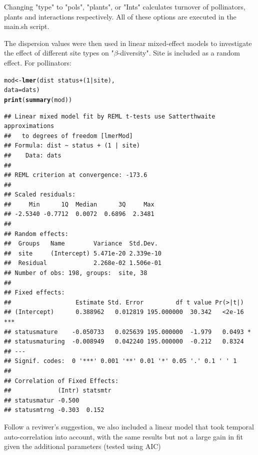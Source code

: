 \documentclass{article}\usepackage[]{graphicx}\usepackage[]{color}
\makeatletter
\newcommand{\hlnum}[1]{\textcolor[rgb]{0.686,0.059,0.569}{#1}}%
\newcommand{\hlopt}[1]{\textcolor[rgb]{0,0,0}{#1}}%
\newcommand{\hlstd}[1]{\textcolor[rgb]{0.345,0.345,0.345}{#1}}%
\newcommand{\hlkwb}[1]{\textcolor[rgb]{0.69,0.353,0.396}{#1}}%
\newcommand{\hlkwc}[1]{\textcolor[rgb]{0.333,0.667,0.333}{#1}}%
\newcommand{\hlkwd}[1]{\textcolor[rgb]{0.737,0.353,0.396}{\textbf{#1}}}%
\newenvironment{kframe}{%
 \def\at@end@of@kframe{}%
 \ifinner\ifhmode%
  \def\at@end@of@kframe{\end{minipage}}%
  \begin{minipage}{\columnwidth}%
 \fi\fi%
 \def\FrameCommand##1{\hskip\@totalleftmargin \hskip-\fboxsep
 \colorbox{shadecolor}{##1}\hskip-\fboxsep
     \hskip-\linewidth \hskip-\@totalleftmargin \hskip\columnwidth}%
 \MakeFramed {\advance\hsize-\width
   \@totalleftmargin\z@ \linewidth\hsize
   \@setminipage}}%
 {\par\unskip\endMakeFramed%
 \at@end@of@kframe}
\newenvironment{knitrout}{}{} %
\makeatother
\begin{document}
Changing "type" to "pols", "plants", or "Ints" calculates turnover of
pollinators, plants and interactions respectively. All of these
options are executed in the main.sh script.

The dispersion values were then used in linear mixed-effect models to
investigate the effect of different site types on
"$\beta$-diversity". Site is included as a random effect. For
pollinators:

\begin{knitrout}
\color{fgcolor}\begin{kframe}
\begin{alltt}
\hlstd{mod} \hlkwb{<-} \hlkwd{lmer}\hlstd{(dist} \hlopt{~} \hlstd{status} \hlopt{+}  \hlstd{(}\hlnum{1}\hlopt{|}\hlstd{site),}
            \hlkwc{data}\hlstd{=dats)}
\hlkwd{print}\hlstd{(}\hlkwd{summary}\hlstd{(mod))}
\end{alltt}
\begin{verbatim}
## Linear mixed model fit by REML t-tests use Satterthwaite approximations
##   to degrees of freedom [lmerMod]
## Formula: dist ~ status + (1 | site)
##    Data: dats
## 
## REML criterion at convergence: -173.6
## 
## Scaled residuals: 
##     Min      1Q  Median      3Q     Max 
## -2.5340 -0.7712  0.0072  0.6896  2.3481 
## 
## Random effects:
##  Groups   Name        Variance  Std.Dev. 
##  site     (Intercept) 5.471e-20 2.339e-10
##  Residual             2.268e-02 1.506e-01
## Number of obs: 198, groups:  site, 38
## 
## Fixed effects:
##                  Estimate Std. Error         df t value Pr(>|t|)    
## (Intercept)      0.388962   0.012819 195.000000  30.342   <2e-16 ***
## statusmature    -0.050733   0.025639 195.000000  -1.979   0.0493 *  
## statusmaturing  -0.008949   0.042240 195.000000  -0.212   0.8324    
## ---
## Signif. codes:  0 '***' 0.001 '**' 0.01 '*' 0.05 '.' 0.1 ' ' 1
## 
## Correlation of Fixed Effects:
##             (Intr) statsmtr
## statusmatur -0.500         
## statusmtrng -0.303  0.152
\end{verbatim}
\end{kframe}
\end{knitrout}

Follow a reviwer's suggestion, we also included a linear model that
took temporal auto-correlation into account, with the same results but
not a large gain in fit given the additional parameters (tested using
AIC)
\end{document}
